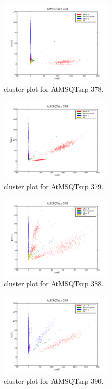 \begin{figure}[H]
\includegraphics[width=0.5\textwidth]{figures/cluster_plot_AtMSQTsnp_378.png}
\caption{cluster plot for AtMSQTsnp 378.} \label{flAtMSQTsnp378}
\end{figure}
\begin{figure}[H]
\includegraphics[width=0.5\textwidth]{figures/cluster_plot_AtMSQTsnp_379.png}
\caption{cluster plot for AtMSQTsnp 379.} \label{flAtMSQTsnp379}
\end{figure}
\begin{figure}[H]
\includegraphics[width=0.5\textwidth]{figures/cluster_plot_AtMSQTsnp_388.png}
\caption{cluster plot for AtMSQTsnp 388.} \label{flAtMSQTsnp388}
\end{figure}
\begin{figure}[H]
\includegraphics[width=0.5\textwidth]{figures/cluster_plot_AtMSQTsnp_390.png}
\caption{cluster plot for AtMSQTsnp 390.} \label{flAtMSQTsnp390}
\end{figure}
